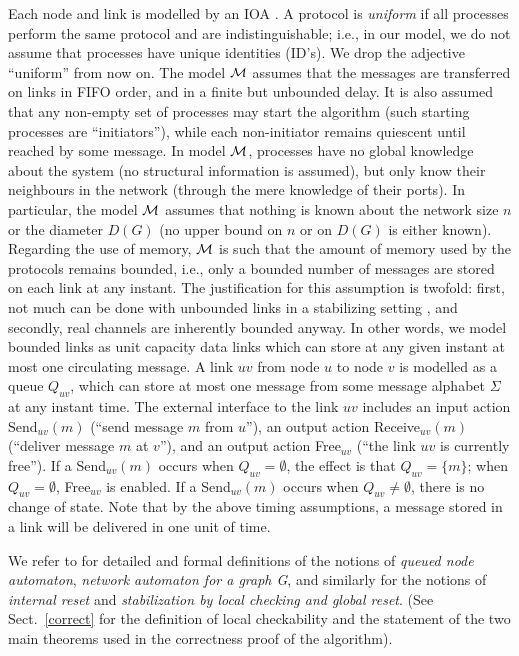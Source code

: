 \documentclass[10pt]{article}
\begin{document}
Each node and link is modelled by an IOA \cite{APVD94,Varg94}.  A
protocol is {\em uniform} if all processes perform the same protocol
and are indistinguishable; i.e., in our model, we do not assume that
processes have unique identities (ID's). We drop the adjective
``uniform'' from now on. The model $\cal M$ assumes that the messages
are transferred on links in FIFO order, and in a finite but unbounded
delay.  It is also assumed that any non-empty set of processes may
start the algorithm (such starting processes are ``initiators''),
while each non-initiator remains quiescent until reached by some
message.  In model $\cal M$, processes have no global knowledge about
the system (no structural information is assumed), but only know their
neighbours in the network (through the mere knowledge of their ports).
In particular, the model $\cal M$ assumes that nothing is known about
the network size $n$ or the diameter $D(G)$ (no upper bound on $n$ or
on $D(G)$ is either known). Regarding the use of memory, $\cal M$ is
such that the amount of memory used by the protocols remains bounded,
i.e., only a bounded number of messages are stored on each link at any
instant. The justification for this assumption is twofold: first, not
much can be done with unbounded links in a stabilizing setting
\cite{APVD94,DoIM91a,Varg94}, and secondly, real channels are
inherently bounded anyway. In other words, we model bounded links as
unit capacity data links which can store at any given instant at most
one circulating message. A link $uv$ from node $u$ to node $v$ is
modelled as a queue $Q_{uv}$, which can store at most one message from
some message alphabet $\Sigma$ at any instant time. The external
interface to the link $uv$ includes an input action {\sc
Send}$_{uv}(m)$ (``send message $m$ from $u$''), an output action {\sc
Receive}$_{uv}(m)$ (``deliver message $m$ at $v$''), and an output
action {\sc Free}$_{uv}$ (``the link $uv$ is currently free'').  If a
{\sc Send}$_{uv}(m)$ occurs when $Q_{uv}=\emptyset$, the effect is
that $Q_{uv}=\{m\}$; when $Q_{uv}=\emptyset$, {\sc Free}$_{uv}$ is
enabled.  If a {\sc Send}$_{uv}(m)$ occurs when $Q_{uv} \neq
\emptyset$, there is no change of state. Note that by the above timing
assumptions, a message stored in a link will be delivered in one unit
of time.

We refer to \cite{APVD94} for detailed and formal definitions of the
notions of {\em queued node automaton}, {\em network automaton for a
graph G}, and similarly for the notions of {\em internal reset} and
{\em stabilization by local checking and global reset}. (See
Sect.~\ref{correct} for the definition of local checkability and the
statement of the two main theorems used in the correctness proof of the
algorithm).
\end{document}
